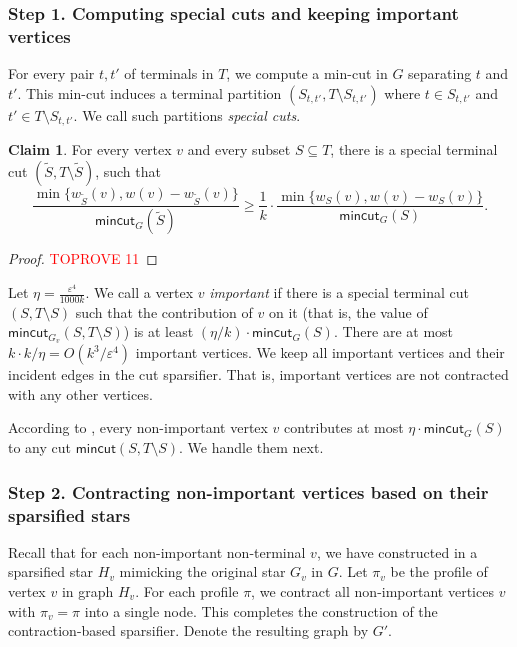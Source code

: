 \documentclass[11pt]{article}
\theoremstyle{definition}
\newtheorem{claim}[theorem]{Claim}
\newcommand{\eps}{{\varepsilon}}
\newcounter{note}
\newcommand{\mc}{\mathsf{mincut}}
\begin{document}
\subsubsection*{Step 1. Computing special cuts and keeping important vertices}

For every pair $t,t'$ of terminals in $T$, we compute a min-cut in $G$ separating $t$ and $t'$. This min-cut induces a terminal partition $(S_{t,t'},T\setminus S_{t,t'})$ where $t\in S_{t,t'}$ and $t'\in T\setminus S_{t,t'}$. We call such partitions \emph{special cuts}.

\begin{claim} \label{lem:contribution}
For every vertex $v$ and every subset $S\subseteq T$, there is a special terminal cut $(\tilde S,T\setminus \tilde S)$, such that 
$$\frac{\min \{w_{\tilde S}(v),w(v)-w_{\tilde S}(v)\}}{\mc_G(\tilde S)} \ge \frac{1}{k}\cdot \frac{\min \{w_S(v),w(v)-w_S(v)\}}{\mc_G(S)}.$$
\end{claim}

\begin{proof}\textcolor{red}{TOPROVE 11}\end{proof}

Let $\eta = \frac{\eps^4}{1000k}$. We call a vertex $v$ \emph{important} if there is a special terminal cut $(S,T\setminus S)$ such that the contribution of $v$ on it (that is, the value of $\mc_{G_v}(S,T\setminus S)$) is at least $(\eta/k)\cdot \mc_G(S)$. There are at most $k \cdot k/\eta  = O(k^3/\eps^4)$ important vertices. We keep all important vertices and their incident edges in the cut sparsifier. That is, important vertices are not contracted with any other vertices.

According to , every non-important vertex $v$ contributes at most $\eta \cdot \mc_G(S)$ to any cut $\mc(S,T\setminus S)$. We handle them next.



\subsubsection*{Step 2. Contracting non-important vertices based on their sparsified stars}

Recall that for each non-important non-terminal $v$, we have constructed in  a sparsified star $H_v$ mimicking the original star $G_v$ in $G$. Let $\pi_v$ be the profile of vertex $v$ in graph $H_v$. For each profile $\pi$, we contract all non-important vertices $v$ with $\pi_v=\pi$ into a single node. This completes the construction of the contraction-based sparsifier. Denote the resulting graph by $G'$.
\end{document}
